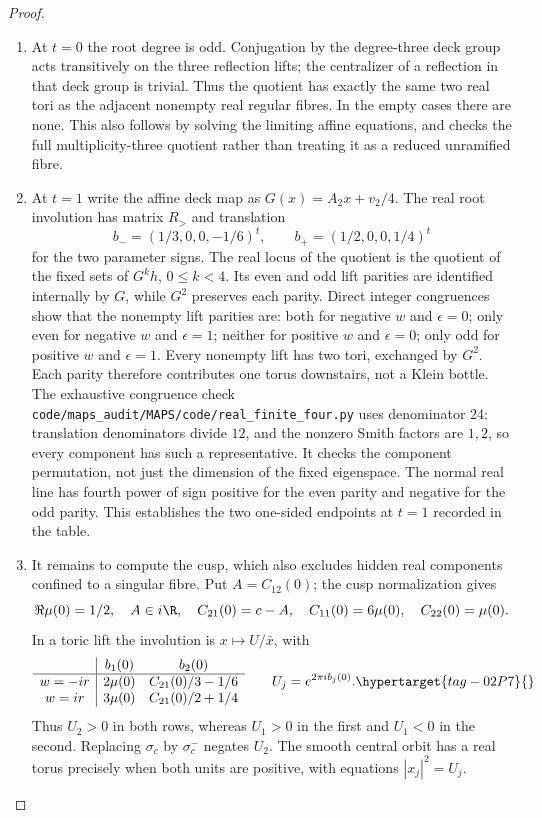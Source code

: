\begin{proof}
\begin{enumerate}[label=\arabic*.,leftmargin=*]
\item At $t=0$ the root degree is odd. Conjugation by the degree-three deck
group acts transitively on the three reflection lifts; the centralizer
of a reflection in that deck group is trivial.
Thus the quotient has exactly the same two real tori as the adjacent
nonempty real regular fibres. In the empty cases there are none. This
also follows by solving the limiting affine equations, and checks the
full multiplicity-three quotient rather than treating it as a reduced
unramified fibre.

\item At $t=1$ write the affine deck map as
$G(x)=A_2x+v_2/4$. The real root involution has matrix $R_>$ and
translation
\[
 b_-=(1/3,0,0,-1/6)^t,
 \qquad b_+=(1/2,0,0,1/4)^t
\]
for the two parameter signs. The real locus of the quotient is the
quotient of the fixed sets of $G^kh$, $0\leq k<4$. Its even and odd
lift parities are identified internally by $G$, while $G^2$ preserves
each parity. Direct integer congruences show that the nonempty lift
parities are: both for negative $w$ and $\epsilon=0$; only even for
negative $w$ and $\epsilon=1$; neither for positive $w$ and $\epsilon=0$;
only odd for positive $w$ and $\epsilon=1$. Every nonempty lift has
two tori, exchanged by $G^2$. Each parity therefore contributes one
torus downstairs, not a Klein bottle. The exhaustive congruence check
\texttt{code/maps\_audit/MAPS/code/real\_finite\_four.py} uses denominator $24$: translation
denominators divide $12$, and the nonzero Smith factors are $1,2$, so
every component has such a representative. It checks the component
permutation, not just the dimension of the fixed eigenspace. The normal
real line has fourth power of sign positive for the even parity and
negative for the odd parity. This establishes the two one-sided
endpoints at $t=1$ recorded in the table.

\item It remains to compute the cusp, which also excludes hidden real
components confined to a singular fibre. Put
$A=C_{12}(0)$; the cusp normalization gives
\[
 \Re\mu(0)=1/2,\quad A\in i\R,\quad C_{21}(0)=c-A,
 \quad C_{11}(0)=6\mu(0),\quad C_{22}(0)=\mu(0).
\]
In a toric lift the involution is
$x\mapsto U/\bar x$, with
\[
\begin{array}{c|cc}
 &b_1(0)&b_2(0)\\\hline
 w=-ir&2\mu(0)&C_{21}(0)/3-1/6\\
 w=ir&3\mu(0)&C_{21}(0)/2+1/4
\end{array}
\qquad U_j=e^{2\pi i b_j(0)}.
\hypertarget{tag-02P7}{}\label{mapsI:real-eq-7}
\]
Thus $U_2>0$ in both rows, whereas $U_1>0$ in the first and $U_1<0$
in the second. Replacing $\sigma_c$ by $\sigma_c^-$ negates $U_2$.
The smooth central orbit has a real torus precisely when both units
are positive, with equations $|x_j|^2=U_j$.


\end{enumerate}
\end{proof}
